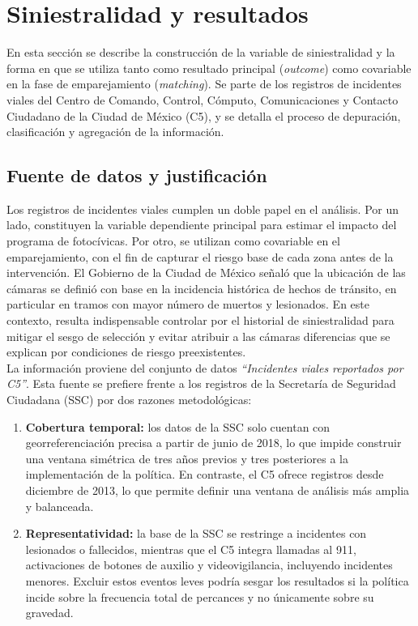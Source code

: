 \section{Siniestralidad y resultados}

En esta sección se describe la construcción de la variable de siniestralidad y la forma en que se utiliza tanto como resultado principal (\textit{outcome}) como covariable en la fase de emparejamiento (\textit{matching}). Se parte de los registros de incidentes viales del Centro de Comando, Control, Cómputo, Comunicaciones y Contacto Ciudadano de la Ciudad de México (C5), y se detalla el proceso de depuración, clasificación y agregación de la información.

\subsection{Fuente de datos y justificación}

\noindent Los registros de incidentes viales cumplen un doble papel en el análisis. Por un lado, constituyen la variable dependiente principal para estimar el impacto del programa de fotocívicas. Por otro, se utilizan como covariable en el emparejamiento, con el fin de capturar el riesgo base de cada zona antes de la intervención. El Gobierno de la Ciudad de México señaló que la ubicación de las cámaras se definió con base en la incidencia histórica de hechos de tránsito, en particular en tramos con mayor número de muertos y lesionados. En este contexto, resulta indispensable controlar por el historial de siniestralidad para mitigar el sesgo de selección y evitar atribuir a las cámaras diferencias que se explican por condiciones de riesgo preexistentes.\\

La información proviene del conjunto de datos \textit{``Incidentes viales reportados por C5''}. Esta fuente se prefiere frente a los registros de la Secretaría de Seguridad Ciudadana (SSC) por dos razones metodológicas:

\begin{enumerate}
    \item \textbf{Cobertura temporal:} los datos de la SSC solo cuentan con georreferenciación precisa a partir de junio de 2018, lo que impide construir una ventana simétrica de tres años previos y tres posteriores a la implementación de la política. En contraste, el C5 ofrece registros desde diciembre de 2013, lo que permite definir una ventana de análisis más amplia y balanceada.
    \item \textbf{Representatividad:} la base de la SSC se restringe a incidentes con lesionados o fallecidos, mientras que el C5 integra llamadas al 911, activaciones de botones de auxilio y videovigilancia, incluyendo incidentes menores. Excluir estos eventos leves podría sesgar los resultados si la política incide sobre la frecuencia total de percances y no únicamente sobre su gravedad.
\end{enumerate}


